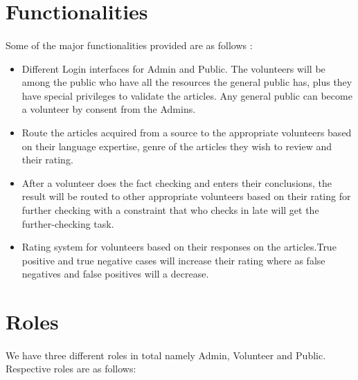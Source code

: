 \documentclass[titlepage,12pt]{article}
\begin{document}
\section{Functionalities}
\paragraph{}
Some of the major functionalities provided are as follows :
\begin{itemize}
    \item Different Login interfaces for Admin and Public. The volunteers will be among the public who have all the resources the general public has, plus they have special privileges to validate the articles. Any general public can become a volunteer by consent from the Admins.
    \item Route the articles acquired from a source to the appropriate volunteers based on their language expertise, genre of the articles they wish to review and their rating.
    \item After a volunteer does the fact checking and enters their conclusions, the result will be routed to other appropriate volunteers based on their rating for further checking with a constraint that who checks in late will get the further-checking task.
    \item Rating system for volunteers based on their responses on the articles.True positive and true negative cases will increase their rating where as false negatives and false positives will a decrease.
    
\end{itemize}

\section{Roles}
    \paragraph{}
    We have three different roles in total namely Admin, Volunteer and Public. Respective roles are as follows:
\end{document}

